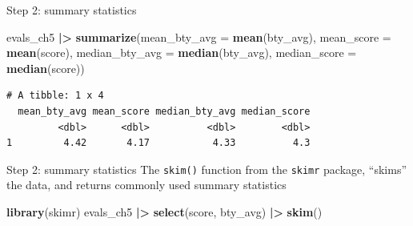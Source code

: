 \documentclass[
  ignorenonframetext,
]{beamer}
\newenvironment{Shaded}{\begin{snugshade}}{\end{snugshade}}
\newcommand{\AttributeTok}[1]{\textcolor[rgb]{0.13,0.29,0.53}{#1}}
\newcommand{\FunctionTok}[1]{\textcolor[rgb]{0.13,0.29,0.53}{\textbf{#1}}}
\newcommand{\NormalTok}[1]{#1}
\newcommand{\SpecialCharTok}[1]{\textcolor[rgb]{0.81,0.36,0.00}{\textbf{#1}}}
\begin{document}
\begin{frame}[fragile]{Step 2: summary statistics}
\protect\hypertarget{step-2-summary-statistics}{}
\normalsize

\begin{Shaded}
\begin{Highlighting}[]
\NormalTok{evals\_ch5 }\SpecialCharTok{|\textgreater{}}
  \FunctionTok{summarize}\NormalTok{(}\AttributeTok{mean\_bty\_avg =} \FunctionTok{mean}\NormalTok{(bty\_avg),}
            \AttributeTok{mean\_score =} \FunctionTok{mean}\NormalTok{(score),}
            \AttributeTok{median\_bty\_avg =} \FunctionTok{median}\NormalTok{(bty\_avg), }
            \AttributeTok{median\_score =} \FunctionTok{median}\NormalTok{(score))}
\end{Highlighting}
\end{Shaded}

\begin{verbatim}
# A tibble: 1 x 4
  mean_bty_avg mean_score median_bty_avg median_score
         <dbl>      <dbl>          <dbl>        <dbl>
1         4.42       4.17           4.33          4.3
\end{verbatim}

\normalsize
\end{frame}

\begin{frame}[fragile]{Step 2: summary statistics}
\protect\hypertarget{step-2-summary-statistics-1}{}
The \texttt{skim()} function from the \texttt{skimr} package, ``skims''
the data, and returns commonly used summary statistics

\normalsize

\begin{Shaded}
\begin{Highlighting}[]
\FunctionTok{library}\NormalTok{(skimr)}
\NormalTok{evals\_ch5 }\SpecialCharTok{|\textgreater{}} 
  \FunctionTok{select}\NormalTok{(score, bty\_avg) }\SpecialCharTok{|\textgreater{}} 
  \FunctionTok{skim}\NormalTok{()}
\end{Highlighting}
\end{Shaded}

\normalsize
\end{frame}
\end{document}
